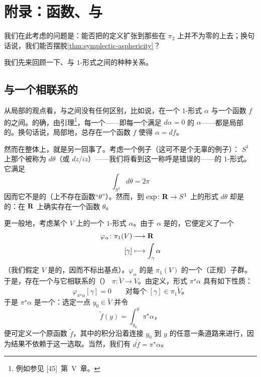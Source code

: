 
\section{附录：函数、\trClosed\trForm{}与\trCovering}
\label{sec:functions-forms-covers}

我们在此考虑的问题是：能否把\trActionFunctional{}的定义扩张到那些\trSymplecticForm{}在 $\pi_2$ 上并不为零的\trSymplectic\trManifold{}上去；换句话说，我们能否摆脱\cref{thm:symplectic-asphericity}？

我们先来回顾一下\trFundamentalGroup、\trCovering{}与\trClosed{} $1$-形式之间的种种关系。

\subsection{与一个\trClosed\trForm{}相联系的\trCovering}
\label{subsec:cover-closed-form}

从局部的观点看，\trClosed\trForm{}与\trExact\trForm{}之间没有任何区别，比如说，在一个\trClosed{} $1$-形式 $\alpha$ 与一个函数 $f$ 的\trDifferential{}之间。的确，由\trPoincare{}引理\footnote{例如参见 [45]~第~V~章。}，每一个\trClosed\trForm——即每一个满足 $d\alpha=0$ 的\trForm{} $\alpha$——都是局部\trExact{}的。换句话说，局部地，总存在一个函数 $f$ 使得 $\alpha=df$。

然而在整体上，就是另一回事了。考虑一个例子（这可不是个无辜的例子）：\trCircle{} $S^1$ 上那个被称为 $d\theta$（或 $dz/iz$）——我们将看到这一称呼是错误的——的\trClosed{} $1$-形式。它满足
\[
\int_{S^1}d\theta=2\pi
\]
因而它不是\trExact{}的（\trCircle{}上不存在函数“$\theta$”）。然而，\trLift{}到\trCovering{} $\exp\colon\mathbf{R}\to S^1$ 上的形式 $d\theta$ 却是\trExact{}的：在 $\mathbf{R}$ 上确实存在一个函数 $\theta$。

更一般地，考虑某个\trManifold{} $V$ 上的一个\trClosed{} $1$-形式 $\alpha$。由于 $\alpha$ 是\trClosed{}的，它便定义了一个\trHomomorphism
\[
\begin{aligned}
\varphi_\alpha\colon\pi_1(V)&\longrightarrow\mathbf{R}\\
{[\gamma]}&\longmapsto\int_\gamma\alpha
\end{aligned}
\]
（我们假定 $V$ 是\trConnected{}的，因而不标出基点）。$\varphi_\alpha$ 的\trKernel{}是 $\pi_1(V)$ 的一个（正规）子群。于是，存在一个与它相联系的\trConnected{}（\trGalois）\trCovering{} $\pi\colon\widetilde{V}\to V$。由定义，形式 $\pi^\star\alpha$ 具有如下性质：
\[
\varphi_{\pi^\star\alpha}[\gamma]=0\qquad\text{对每个 }[\gamma]\in\pi_1\widetilde{V}\text{。}
\]
于是 $\pi^\star\alpha$ 是一个\trExact\trForm：选定一点 $y_0\in\widetilde{V}$ 并令
\[
\widetilde{f}(y)=\int_{y_0}^{y}\pi^\star\alpha\text{，}
\]
便可定义一个原函数 $\widetilde{f}$，其中的积分沿着连接 $y_0$ 到 $y$ 的任意一条道路来进行，因为结果不依赖于这一选取。当然，我们有 $d\widetilde{f}=\pi^\star\alpha$。


